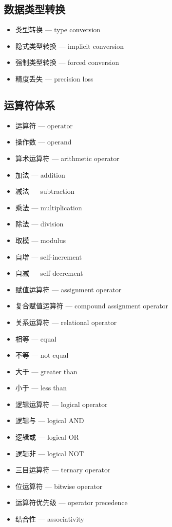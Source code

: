 \subsection{数据类型转换}
\begin{itemize}
\item 类型转换 — type conversion
\item 隐式类型转换 — implicit conversion
\item 强制类型转换 — forced conversion
\item 精度丢失 — precision loss
\end{itemize}

\subsection{运算符体系}
\begin{itemize}
\item 运算符 — operator
\item 操作数 — operand
\item 算术运算符 — arithmetic operator
\item 加法 — addition
\item 减法 — subtraction
\item 乘法 — multiplication
\item 除法 — division
\item 取模 — modulus
\item 自增 — self-increment
\item 自减 — self-decrement
\item 赋值运算符 — assignment operator
\item 复合赋值运算符 — compound assignment operator
\item 关系运算符 — relational operator
\item 相等 — equal
\item 不等 — not equal
\item 大于 — greater than
\item 小于 — less than
\item 逻辑运算符 — logical operator
\item 逻辑与 — logical AND
\item 逻辑或 — logical OR
\item 逻辑非 — logical NOT
\item 三目运算符 — ternary operator
\item 位运算符 — bitwise operator
\item 运算符优先级 — operator precedence
\item 结合性 — associativity
\end{itemize}

